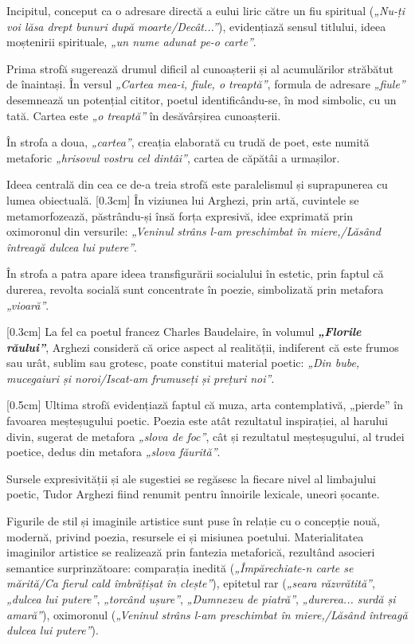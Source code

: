 Incipitul, conceput ca o adresare directă a eului liric către un fiu spiritual (\textit{„Nu-ți voi lăsa drept bunuri după moarte/Decât...”}), evidențiază sensul titlului, ideea moștenirii spirituale, \textit{„un nume adunat pe-o carte”}.

Prima strofă sugerează drumul dificil al cunoașterii și al acumulărilor străbătut de înaintași. În versul \textit{„Cartea mea-i, fiule, o treaptă”}, formula de adresare \textit{„fiule”} desemnează un potențial cititor, poetul identificându-se, în mod simbolic, cu un tată. Cartea este \textit{„o treaptă”} în desăvârșirea cunoașterii.

În strofa a doua, \textit{„cartea”}, creația elaborată cu trudă de poet, este numită metaforic \textit{„hrisovul vostru cel dintâi”}, cartea de căpătâi a urmașilor.

Ideea centrală din cea ce de-a treia strofă este paralelismul și suprapunerea cu lumea obiectuală.
[0.3cm]
În viziunea lui Arghezi, prin artă, cuvintele se metamorfozează, \hbox{păstrându-și} însă forța expresivă, idee exprimată prin oximoronul din versurile: \textit{„Veninul strâns l-am preschimbat în miere,/Lăsând întreagă dulcea lui putere”}.

În strofa a patra apare ideea transfigurării socialului în estetic, prin faptul că durerea, revolta socială sunt concentrate în poezie, simbolizată prin metafora \textit{„vioară”}.

[0.3cm]
La fel ca poetul francez Charles Baudelaire, în volumul \textbf{\textit{„Florile răului”}}, Arghezi consideră că orice aspect al realității, indiferent că este frumos sau urât, sublim sau grotesc, poate constitui material poetic: \textit{„Din bube, mucegaiuri și noroi/Iscat-am frumuseți și prețuri noi”}.

[0.5cm]
Ultima strofă evidențiază faptul că muza, arta contemplativă, „pierde” în favoarea meșteșugului poetic.
Poezia este atât rezultatul inspirației, al harului divin, sugerat de metafora \textit{„slova de foc”}, cât și rezultatul meșteșugului, al trudei poetice, dedus din metafora \textit{„slova făurită”}.

Sursele expresivității și ale sugestiei se regăsesc la fiecare nivel al limbajului poetic, Tudor Arghezi fiind renumit pentru înnoirile lexicale, uneori șocante.

Figurile de stil și imaginile artistice sunt puse în relație cu o concepție nouă, modernă, privind poezia, resursele ei și misiunea poetului. Materialitatea imaginilor artistice se realizează prin fantezia metaforică, rezultând asocieri semantice surprinzătoare: comparația inedită (\textit{„Împărechiate-n carte se mărită/Ca fierul cald îmbrățișat în clește”}), epitetul rar (\textit{„seara răzvrătită”}, \textit{„dulcea lui putere”}, \textit{„torcând ușure”}, \textit{„Dumnezeu de piatră”}, \textit{„durerea... surdă și amară”}), oximoronul (\textit{„Veninul strâns l-am preschimbat în miere,/Lăsând întreagă dulcea lui putere”}).

